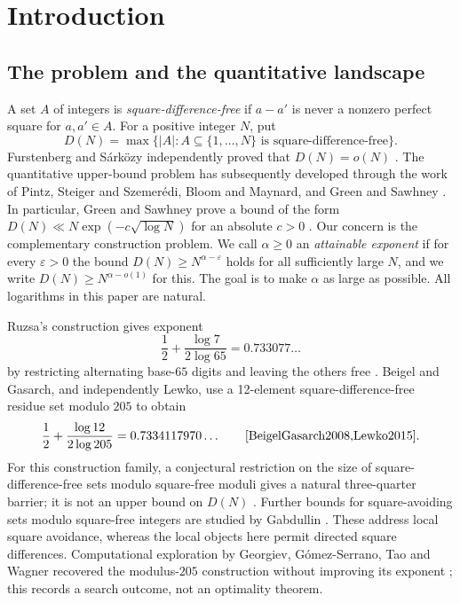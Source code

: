 \documentclass[11pt]{article}
\theoremstyle{definition}
\theoremstyle{remark}
\newcommand{\card}[1]{\lvert #1\rvert}
\begin{document}
\section{Introduction}\label{sec:intro}
\subsection{The problem and the quantitative landscape}
A set $A$ of integers is \emph{square-difference-free} if $a-a'$ is never a
nonzero perfect square for $a,a'\in A$. For a positive integer $N$, put
\[
 D(N)=\max\bigl\{\card A:A\subseteq\{1,\ldots,N\}\text{ is square-difference-free}\bigr\}.
\]
Furstenberg and S\'ark\"ozy independently proved that $D(N)=o(N)$
\cite{Furstenberg1977,Sarkozy1978}. The quantitative upper-bound problem has
subsequently developed through the work of Pintz, Steiger and Szemer\'edi,
Bloom and Maynard, and Green and Sawhney
\cite{PintzSteigerSzemeredi1988,BloomMaynard2022,GreenSawhney2025}.
In particular, Green and Sawhney prove a bound of the form
$D(N)\ll N\exp(-c\sqrt{\log N})$ for an absolute $c>0$
\cite[Theorem 1.1]{GreenSawhney2025}.
Our concern is the complementary construction problem. We call
$\alpha\ge0$ an \emph{attainable exponent} if for every $\varepsilon>0$ the
bound $D(N)\ge N^{\alpha-\varepsilon}$ holds for all sufficiently large $N$,
and we write $D(N)\ge N^{\alpha-o(1)}$ for this. The goal is to make $\alpha$
as large as possible. All logarithms in this paper are natural.

Ruzsa's construction gives exponent
\[
 \frac12+\frac{\log7}{2\log65}=0.733077\ldots
\]
by restricting alternating base-$65$ digits and leaving the others free
\cite{Ruzsa1984}. Beigel and Gasarch, and independently Lewko, use a
12-element square-difference-free residue set modulo $205$ to obtain
\[
 \frac12+\frac{\log12}{2\log205}=0.7334117970\ldots
 \qquad\cite{BeigelGasarch2008,Lewko2015}.
\]
For this construction family, a conjectural restriction on the size of
square-difference-free sets modulo square-free moduli gives a natural
three-quarter barrier; it is not an upper bound on $D(N)$
\cite{Ruzsa1984,Lewko2015}.
Further bounds for square-avoiding sets modulo square-free integers are
studied by Gabdullin \cite{Gabdullin2018}. These address local square
avoidance, whereas the local objects here permit directed square differences.
Computational exploration by Georgiev, G\'omez-Serrano, Tao and Wagner
recovered the modulus-$205$ construction without improving its exponent
\cite[Section 16]{GeorgievEtAl2025}; this records a search outcome, not
an optimality theorem.
\end{document}
